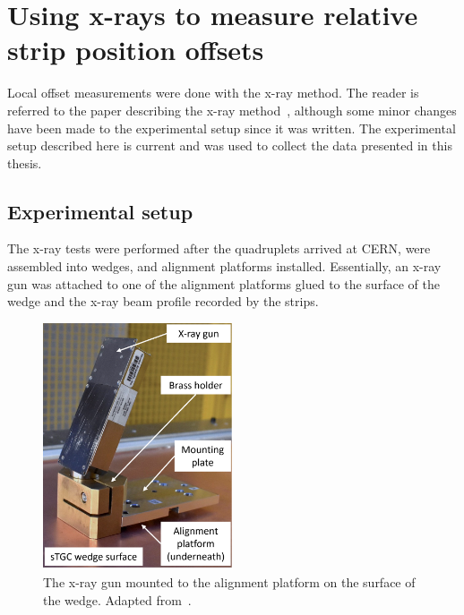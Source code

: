 
\chapter{Using x-rays to measure relative strip position offsets}
\label{chap:xray}

Local offset measurements were done with the x-ray method. The reader is referred to the paper describing the x-ray method~\cite{lefebvre_precision_2020}, although some minor changes have been made to the experimental setup since it was written. The experimental setup described here is current and was used to collect the data presented in this thesis.

\section{Experimental setup}

The x-ray tests were performed after the quadruplets arrived at CERN, were assembled into wedges, and alignment platforms installed. Essentially, an x-ray gun was attached to one of the alignment platforms glued to the surface of the wedge and the x-ray beam profile recorded by the strips.

\begin{figure}
    \centering
    \includegraphics[width = 0.5\textwidth]{figures/xray_setup.png}
    \caption{The x-ray gun mounted to the alignment platform on the surface of the wedge. Adapted from~\cite{lefebvre_precision_2020}.}
    \label{fig:xray_setup}
\end{figure}

